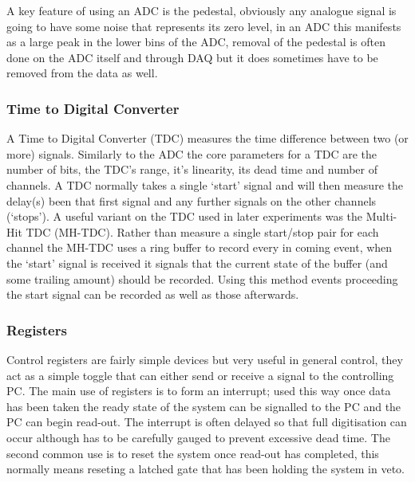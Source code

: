 A key feature of using an ADC is the pedestal, obviously any analogue signal is going to have some noise that represents its zero level, in an ADC this manifests as a large peak in the lower bins of the ADC, removal of the pedestal is often done on the ADC itself and through DAQ but it does sometimes have to be removed from the data as well.

\subsubsection{Time to Digital Converter} %
\label{ssub:time_to_digital_converter}
A Time to Digital Converter (TDC) measures the time difference between two (or more) signals. Similarly to the ADC the core parameters for a TDC are the number of bits, the TDC's range, it's linearity, its dead time and number of channels. A TDC normally takes a single `start' signal and will then measure the delay(s) been that first signal and any further signals on the other channels (`stops'). A useful variant on the TDC used in later experiments was the Multi-Hit TDC (MH-TDC). Rather than measure a single start/stop pair for each channel the MH-TDC uses a ring buffer to record every in coming event, when the `start' signal is received it signals that the current state of the buffer (and some trailing amount) should be recorded. Using this method events proceeding the start signal can be recorded as well as those afterwards.

\subsubsection{Registers} %
\label{ssub:registers}
Control registers are fairly simple devices but very useful in general control, they act as a simple toggle that can either send or receive a signal to the controlling PC. The main use of registers is to form an interrupt; used this way once data has been taken the ready state of the system can be signalled to the PC and the PC can begin read-out. The interrupt is often delayed so that full digitisation can occur although has to be carefully gauged to prevent excessive dead time. The second common use is to reset the system once read-out has completed, this normally means reseting a latched gate that has been holding the system in veto.

